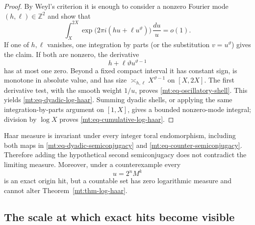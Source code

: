 \documentclass[11pt,oneside]{article}
\theoremstyle{definition}
\theoremstyle{remark}
\newcommand{\Z}{\mathbb Z}
\newcommand{\thetaq}{\vartheta}
\begin{document}
\begin{proof}
By Weyl's criterion it is enough to consider a nonzero Fourier mode $(h,\ell)\in\Z^2$ and show
that
\begin{equation}
 \int_X^{2X}\exp\bigl(2\pi i(hu+\ell u^{\thetaq})\bigr)\,\frac{du}{u}=o(1).
 \label{mt:eq-oscillatory-shell}
\end{equation}
If one of $h,\ell$ vanishes, one integration by parts (or the substitution $v=u^{\thetaq}$)
gives the claim.  If both are nonzero, the derivative
\[
 h+\ell\thetaq u^{\thetaq-1}
\]
has at most one zero.  Beyond a fixed compact interval it has constant sign, is monotone in
absolute value, and has size $\asymp_{h,\ell}X^{\thetaq-1}$ on $[X,2X]$.  The first derivative
test, with the smooth weight $1/u$, proves \eqref{mt:eq-oscillatory-shell}.  This yields
\eqref{mt:eq-dyadic-log-haar}.  Summing dyadic shells, or applying the same integration-by-parts
argument on $[1,X]$, gives a bounded nonzero-mode integral; division by $\log X$ proves
\eqref{mt:eq-cumulative-log-haar}.
\end{proof}

Haar measure is invariant under every integer toral endomorphism, including both maps in
\eqref{mt:eq-dyadic-semiconjugacy} and \eqref{mt:eq-counter-semiconjugacy}.  Therefore adding
the hypothetical second semiconjugacy does not contradict the limiting measure.  Moreover,
under a counterexample every
\begin{equation}
 u=2^nM^k
 \label{mt:eq-origin-hit-semigroup}
\end{equation}
is an exact origin hit, but a countable set has zero logarithmic measure and cannot alter
Theorem~\ref{mt:thm-log-haar}.

\subsection{The scale at which exact hits become visible}
\end{document}

